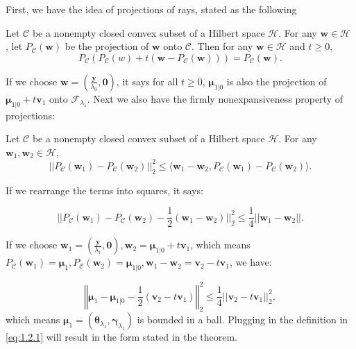 First, we have the idea of projections of rays, stated as the following

\begin{lemma}
    \citep{Bauschke2011}
    Let $\mathcal{C}$ be a nonempty closed convex subset of a Hilbert space $\mathcal{H}$. For any $\boldsymbol w\in\mathcal{H}$ , let $P_{\mathcal{C}}(\boldsymbol w)$ be the projection of $\boldsymbol w$ onto $\mathcal{C}$. Then for any $\boldsymbol w\in\mathcal{H}$ and $t\geq 0$,
    \begin{equation}
        P_{\mathcal{C}}\left(P_{\mathcal{C}}(w)+t\left(\boldsymbol w-P_{\mathcal{C}}(\boldsymbol w)\right)\right)=P_{\mathcal{C}}(\boldsymbol w).
    \end{equation}
\end{lemma}

If we choose $\boldsymbol w=(\frac{\boldsymbol y}{\lambda_0},\boldsymbol0)$, it says for all $t\geq 0$, $\boldsymbol\mu_{1|0}$ is also the projection of $\boldsymbol\mu_{1|0}+t\boldsymbol v_1$ onto $\mathcal{F}_{\lambda_1}$. Next we also have the firmly nonexpansiveness property of projections:

\begin{lemma}
    \citep{Bauschke2011}
    Let $\mathcal{C}$ be a nonempty closed convex subset of a Hilbert space $\mathcal{H}$. For any $\boldsymbol w_1,\boldsymbol w_2\in\mathcal{H}$,
    \begin{equation}
        ||P_{\mathcal{C}}(\boldsymbol w_1)-P_{\mathcal{C}}(\boldsymbol w_2)||_2^2\leq \langle\boldsymbol w_1-\boldsymbol w_2, P_{\mathcal{C}}(\boldsymbol w_1)-P_{\mathcal{C}}(\boldsymbol w_2)\rangle.
    \end{equation}
\end{lemma}

If we rearrange the terms into squares, it says:

\begin{equation}
    ||P_{\mathcal{C}}(\boldsymbol w_1)-P_{\mathcal{C}}(\boldsymbol w_2)-\frac{1}{2}(\boldsymbol w_1-\boldsymbol w_2)||_2^2\leq\frac{1}{4}||\boldsymbol w_1-\boldsymbol w_2||.
\end{equation}

If we choose $\boldsymbol w_1=(\frac{\boldsymbol y}{\lambda_1},\boldsymbol0),\boldsymbol w_2=\boldsymbol\mu_{1|0}+t\boldsymbol v_1$, which means $P_{\mathcal{C}}(\boldsymbol w_1)=\boldsymbol\mu_1,P_{\mathcal{C}}(\boldsymbol w_2)=\boldsymbol\mu_{1|0},\boldsymbol w_1-\boldsymbol w_2=\boldsymbol v_2-t\boldsymbol v_1$, we have:

\begin{equation}
    \left\Vert\boldsymbol\mu_1-\boldsymbol\mu_{1|0}-\frac{1}{2}(\boldsymbol v_2-t\boldsymbol v_1)\right\Vert_2^2\leq\frac{1}{4}||\boldsymbol v_2-t\boldsymbol v_1||_2^2,
\end{equation}
which means $\boldsymbol\mu_1=(\boldsymbol\theta_{\lambda_1},\boldsymbol\gamma_{\lambda_1})$ is bounded in a ball. Plugging in the definition in \eqref{eq:1.2.1} will result in the form stated in the theorem.

